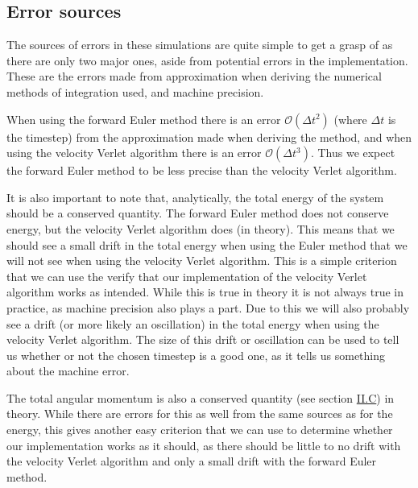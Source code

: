 \documentclass[reprint,english,notitlepage]{revtex4-1}  %
\begin{document}
\subsection{Error sources} \label{sec:III:c}

The sources of errors in these simulations are quite simple to get a grasp of as there are only two major ones, aside from potential errors in the implementation. These are the errors made from approximation when deriving the numerical methods of integration used, and machine precision.

When using the forward Euler method there is an error $\mathcal{O}(\Delta t^2)$ (where $\Delta t$ is the timestep) from the approximation made when deriving the method, and when using the velocity Verlet algorithm there is an error $\mathcal{O}(\Delta t^3)$. Thus we expect the forward Euler method to be less precise than the velocity Verlet algorithm.

It is also important to note that, analytically, the total energy of the system should be a conserved quantity. The forward Euler method does not conserve energy, but the velocity Verlet algorithm does (in theory). This means that we should see a small drift in the total energy when using the Euler method that we will not see when using the velocity Verlet algorithm. This is a simple criterion that we can use the verify that our implementation of the velocity Verlet algorithm works as intended. While this is true in theory it is not always true in practice, as machine precision also plays a part. Due to this we will also probably see a drift (or more likely an oscillation) in the total energy when using the velocity Verlet algorithm. The size of this drift or oscillation can be used to tell us whether or not the chosen timestep is a good one, as it tells us something about the machine error.

The total angular momentum is also a conserved quantity (see section \hyperref[sec:II:c]{II.C}) in theory. While there are errors for this as well from the same sources as for the energy, this gives another easy criterion that we can use to determine whether our implementation works as it should, as there should be little to no drift with the velocity Verlet algorithm and only a small drift with the forward Euler method.
\end{document}
